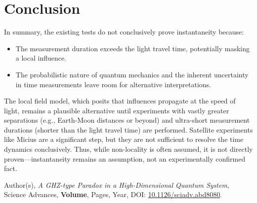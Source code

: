 \documentclass[12pt,landscape]{article}
\begin{document}
	\section*{Conclusion}
	In summary, the existing tests do not conclusively prove instantaneity because:
	\begin{itemize}
		\item The measurement duration exceeds the light travel time, potentially masking a local influence.
		\item The probabilistic nature of quantum mechanics and the inherent uncertainty in time measurements leave room for alternative interpretations.
	\end{itemize}
	The local field model, which posits that influences propagate at the speed of light, remains a plausible alternative until experiments with vastly greater separations (e.g., Earth-Moon distances or beyond) and ultra-short measurement durations (shorter than the light travel time) are performed. Satellite experiments like Micius are a significant step, but they are not sufficient to resolve the time dynamics conclusively. Thus, while non-locality is often assumed, it is not directly proven—instantaneity remains an assumption, not an experimentally confirmed fact.
	
	\begin{thebibliography}{9}
		Author(s), \emph{A GHZ-type Paradox in a High-Dimensional Quantum System}, Science Advances, \textbf{Volume}, Pages, Year, DOI: \href{https://doi.org/10.1126/sciadv.abd8080}{10.1126/sciadv.abd8080}.
	\end{thebibliography}
	
\end{document}

